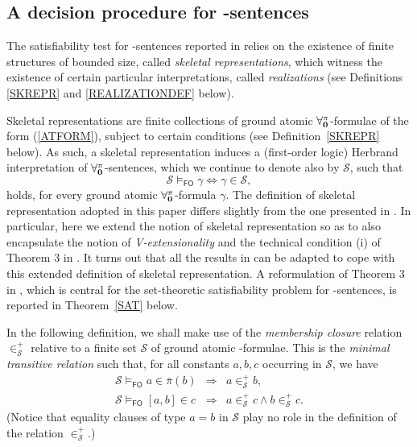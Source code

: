 \documentclass[manyauthors]{fundam}
\newcommand{\memclosure}[1]{\in_{#1}^{+}}
\newcommand{\pairin}[3]{\left[#1,#2\right] \in #3}
\newcommand{\nonpairin}[2]{#1 \in \bar{\pi}(#2)}
\newcommand{\atset}{\mathcal{S}}
\newcommand{\consta}{a}
\newcommand{\constb}{b}
\newcommand{\constc}{c}
\newcommand{\fomodels}[2]{#1 \models_{\mathsf{FO}} #2}
\begin{document}
\subsection{A decision procedure for \Forallpizero-sentences}\label{DECPROC}

The satisfiability test for \Forallpizero-sentences reported in
\cite{CanLonNic2011} relies on the existence of finite structures of
bounded size, called \emph{skeletal representations}, which witness
the existence of certain particular interpretations, called \emph{realizations}
(see Definitions \ref{SKREPR} and \ref{REALIZATIONDEF} below).


Skeletal representations are finite collections of ground atomic
$\mathbf{\forall_{0}^{\pi}}$-formulae of the form (\ref{ATFORM}), subject to 
certain conditions (see Definition~\ref{SKREPR} below). As such, a 
skeletal representation induces a (first-order logic) Herbrand 
interpretation of $\mathbf{\forall_{0}^{\pi}}$-sentences, which we continue to 
denote also by $\atset$, such that
\[
  \fomodels{\atset}{\gamma} \iff \gamma \in \atset ,
\]
holds, for every ground atomic $\mathbf{\forall_{0}^{\pi}}$-formula $\gamma$.
The definition of skeletal representation adopted in this paper
differs slightly from the one presented in \cite{CanLonNic2011}.  In
particular, here we extend the notion of skeletal representation so as
to also encapsulate the notion of \emph{V-extensionality} and the
technical condition (i) of Theorem 3 in \cite{CanLonNic2011}.
It turns out that all the results in \cite{CanLonNic2011}
can be adapted to cope with this extended definition of skeletal
representation.
A reformulation of Theorem 3 in \cite{CanLonNic2011}, which is central
for the set-theoretic satisfiability problem for \Forallpizero-sentences,
is reported in Theorem~\ref{SAT} below.

In the following definition, we shall make use of the \emph{membership
closure} relation $\memclosure{\atset}$ relative to a finite set 
$\atset$ of ground atomic \Forallpizero-formulae. This is the 
\emph{minimal transitive relation} such that, for all constants 
$\consta, \constb, \constc$
occurring in $\atset$, we have
\[
  \begin{array}{rcl}
   \fomodels{\atset}{\nonpairin{\consta}{\constb}} & \Longrightarrow & 
\consta \memclosure{\atset} \constb ,\\
   \fomodels{\atset}{\pairin{\consta}{\constb}{\constc}} & 
\Longrightarrow & \consta \memclosure{\atset} \constc \wedge \constb 
\memclosure{\atset} \constc .
  \end{array}
\]
(Notice that equality clauses of type $a = b$ in $\atset$ play no 
role in the definition of the relation $\memclosure{\atset}$.)
\end{document}
